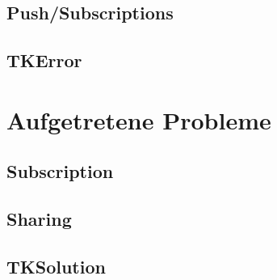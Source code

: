 \subsection{Push/Subscriptions}


\subsection{TKError}

\section{Aufgetretene Probleme}

\subsection{Subscription}

\subsection{Sharing}

\subsection{TKSolution}